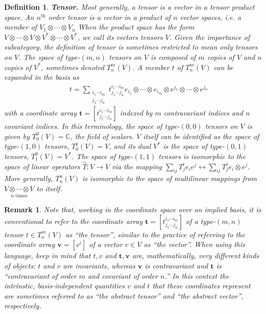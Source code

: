 \documentclass[11pt,fleqn]{article}
\newcommand{\eth}{\ensuremath{^\text{th}}}
\newcommand{\op}[1]{\ensuremath{\hat{#1}}}
\newcommand{\cd}{\ensuremath{\cdots}}
\newcommand{\bmit}[1]{{\bfseries\itshape\mathversion{bold}#1}}
\newcommand{\mb}[1]{\ensuremath{\mathbb{#1}}}
\newcommand{\bo}[1]{\ensuremath{\mathbf{#1}}}
\newcommand{\miniar}[1]{\ensuremath{\begin{smallmatrix}#1\end{smallmatrix}}}
\theoremstyle{mystyle}
\newtheorem{dfn}{Definition}
\newtheorem{rmk}{Remark}
\numberwithin{equation}{section}
\begin{document}
\begin{dfn}
\bmit{Tensor.}
Most generally, a \textit{tensor} is a vector in a tensor product space.
An \textit{$n\eth$ order tensor} is a vector in a product of $n$ vector spaces, i.e. a member of $V_1\otimes\cd\otimes V_n$
When the product space has the form $V\otimes\cd\otimes V\otimes V^*\otimes\cd\otimes V^*$, we call its vectors \textit{tensors $V$}.
Given the importance of subcategory, the definition of \textit{tensor} is sometimes restricted to mean only \textit{tensors on $V$}.
The space of \textit{type-$(m,n)$ tensors on $V$} is composed of $m$ copies of $V$ and $n$ copies of $V^*$, sometimes denoted ${T}_n^m(V)$.
A member $t$ of $T_n^m(V)$ can be expanded in the basis as
\begin{align*}
&&
  t
=
  \sum_{\miniar{i_1\cd i_m\\j_1\cd j_n}}
  t^{i_1\cd i_m}_{j_1\cd j_n}
  e_{i_1}\otimes\cd\otimes e_{i_m}\otimes
  e^{j_1}\otimes\cd\otimes e^{j_n}
\end{align*}
with a coordinate array $\bo{t}=[t^{i_1\cd i_m}_{j_1\cd j_n}]$ indexed by $m$ contravariant indices and $n$ covariant indices.
In this terminology, the space of type-$(0,0)$ tensors on $V$ is given by $T_0^0(V)=\mb{C}$, the field of scalars.
$V$ itself can be identified as the space of type-$(1,0)$ tensors, $T_0^1(V)=V$, and its dual $V^*$ is the space of type-$(0,1)$ tensors, $T_1^0(V)=V^*$.
The space of type-$(1,1)$ tensors is isomorphic to the space of linear operators $\op{T}:V\rightarrow V$ via the mapping $\sum_{ij}T_j^ie_ie^j\leftrightarrow\sum_{ij}T_j^ie_i\otimes e^j$.
More generally, $T_n^n(V)$ is isomorphic to the space of multilinear mappings from $\underset{\text{$n$ times}}{V\otimes\cd\otimes V}$ to itself.
\end{dfn}

\begin{rmk}
Note that, working in the coordinate space over an implied basis, it is conventional to refer to the coordinate array $\bo{t}=[t^{i_1\cd i_m}_{j_1\cd j_n}]$ of a type-$(m,n)$ tensor $t\in T_n^m(V)$ as ``the tensor'', similar to the practice of referring to the coordinate array $\bo{v}=[v^i]$ of a vector $v\in V$ as ``the vector''.
When using this language, keep in mind that $t, v$ and $\bo{t}, \bo{v}$ are, mathematically, very different kinds of objects: $t$ and $v$ are \textit{invariants}, whereas $\bo{v}$ is \textit{contravariant} and $\bo{t}$ is ``contravariant of order $m$ and covariant of order $n$.''
In this context the intrinstic, basis-independent quantities $v$ and $t$ that these coordinates represent are sometimes referred to as ``the abstract tensor'' and ``the abstract vector'', respectively.
\end{rmk}
\end{document}
